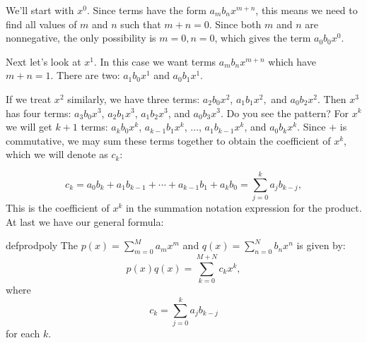 We'll start with $x^0$. Since terms have the form $a_m b_n x^{m+n}$, this means we need to find all values of $m$ and $n$ such that $m+n=0$.  Since both $m$ and $n$ are nonnegative, the only possibility is $m=0,n=0$, which gives the term $a_0 b_0 x^{0}$.

Next let's look at $x^1$. In this case we want terms $a_m b_n x^{m+n}$ which have $m+n=1$.  There are two: $a_1 b_0 x^{1}$ and $a_0 b_1 x^{1}$.

If we treat $x^2$ similarly, we have three terms: $a_2 b_0 x^{2}$, $a_1 b_1 x^{2}, $  and $a_0 b_2 x^{2}$.  Then $x^3$ has four terms: $a_3 b_0 x^{3}$, $a_2 b_1 x^{3}$, $a_1b_2 x^{3}$, and  $a_0b_3x^3$.  Do you see the pattern? For $x^k$ we will get $k+1$ terms:  $a_k b_0 x^{k}$, $ a_{k-1} b_1 x^{k}$, $\ldots$, $a_1 b_{k-1} x^{k}$, and $a_0 b_{k} x^{k}$.  Since $+$ is commutative, we may sum these terms together to obtain the coefficient of $x^k$, which we will denote as $c_k$:

\[
c_k  = a_0  b_k + a_1 b_{k -1} + \cdots + a_{k -1} b _1 + a_k b_0 = \sum_{j = 0}^k a_j b_{k - j},
\]
This is the coefficient of $x^k$ in the summation notation expression for the product. At last we have our general formula:

\begin{defn}{defprodpoly} The  $p(x)= \sum^{M}_{m=0} a_m x^m$ and $q(x)=\sum^{N}_{n=0} b_n x^n$ is given by: 
\[
p(x) q(x) = \sum_{k=0}^{M+N} c_k x^k,
\]
where
\[
c_k=  \sum_{j = 0}^k a_j b_{k - j}
\]
for each $k$.  
\end {defn}

